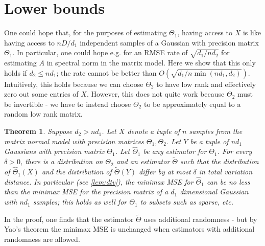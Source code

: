 \documentclass[aos]{imsart}
\newtheorem{theorem}{Theorem}[section]
\theoremstyle{definition}
\numberwithin{equation}{section}
\newcommand{\CF}[1]{{\color{purple}[CF: #1]}}
\begin{document}
\section{Lower bounds}
One could hope that, for the purposes of estimating $\Theta_1$, having access to $X$ is like having access to $n D/d_1$ independent samples of a Gaussian with precision matrix $\Theta_1$. In particular, one could hope e.g. for an RMSE rate of $\sqrt{ d_1/ n d_2}$ for estimating $A$ in spectral norm in the matrix model. Here we show that this only holds if $d_2 \leq n d_1$; the rate cannot be better than $O(\sqrt{d_1/ n \min(n d_1, d_2)})$. Intuitively, this holds because we can choose $\Theta_2$ to have low rank and effectively zero out some entries of $X$. However, this does not quite work because $\Theta_2$ must be invertible - we have to instead choose $\Theta_2$ to be approximately equal to a random low rank matrix.

\begin{theorem}Suppose $d_2 > n d_1$. Let $X$ denote a tuple of $n$ samples from the matrix normal model with precision matrices $\Theta_1, \Theta_2$. Let $Y$ be a tuple of $nd_1$ Gaussians with precision matrix $\Theta_1$. Let $\widehat{\Theta}_1$ be any estimator for $\Theta_1$. For every $\delta > 0$, there is a distribution on $\Theta_2$ and an estimator $\tilde{\Theta}$ such that the distribution of $\widehat{\Theta}_1(X)$ and the distribution of $\tilde{\Theta}(Y)$ differ by at most $\delta$ in total variation distance. In particular (see \cref{lem:dtv}), the minimax MSE for $\widehat{\Theta}_1$ can be no less than the minimax MSE for the precision matrix of a $d_1$ dimensional Gaussian with $nd_1$ samples; this holds as well for $\Theta_1$ to subsets such as sparse, etc. %
\end{theorem}
In the proof, one finds that the estimator $\tilde{\Theta}$ uses additional randomness - but by Yao's theorem the minimax MSE is unchanged when estimators with additional randomness are allowed.
\end{document}
